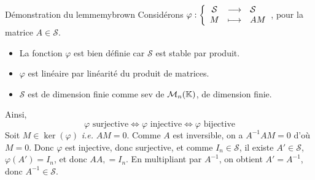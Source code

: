     \begin{demo}{Démonstration du lemme}{mybrown}
        Considérons $\fonction{\varphi}{\mathcal{S}}{\mathcal{S}}{M}{AM}$, pour la matrice $A \in \mathcal{S}$.
        \begin{itemize}
            \item La fonction $\varphi$ est bien définie car $\mathcal{S}$ est stable par produit.
            \item $\varphi$ est linéaire par linéarité du produit de matrices.
            \item $\mathcal{S}$ est de dimension finie comme sev de $\mathcal{M}_{n}(\mathbb{K})$, de dimension finie.
        \end{itemize}
        Ainsi,
        \[ \varphi \text{ surjective} \iff \varphi \text{ injective} \iff \varphi \text{ bijective} \]
        Soit $M \in \ker(\varphi)$ \textit{i.e.} $AM = 0$. Comme $A$ est inversible, on a $A^{-1} A M = 0$ d’où $M = 0$. Donc $\varphi$ est injective, donc surjective, et comme $I_n \in \mathcal{S}$, il existe $A' \in \mathcal{S}$, $\varphi(A') = I_n$, et donc $A A, = I_n$. En multipliant par $A^{-1}$, on obtient $A' = A^{-1}$, donc $A^{-1} \in \mathcal{S}$.
    \end{demo}

